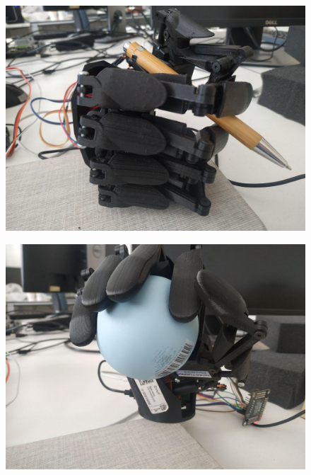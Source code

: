 \documentclass[thesis=B,czech]{FITthesis}[2012/06/26]
\begin{document}
 \begin{figure}[H]
\centering
\includegraphics[scale=0.3]{./image/testSolF4.jpg}
\end{figure} 



 \begin{figure}[H]
\centering
\includegraphics[scale=0.3]{./image/testSolF5.jpg}
\end{figure} 
\end{document}
